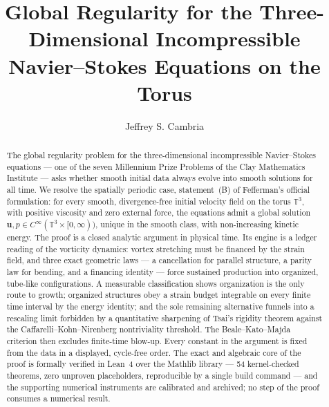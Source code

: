 \documentclass[11pt,letterpaper]{amsart}
\theoremstyle{definition}
\theoremstyle{remark}
\newcommand{\TT}{\mathbb{T}}
\newcommand{\uu}{\boldsymbol{u}}
\begin{document}
\title[Global regularity for Navier--Stokes on the torus]{Global Regularity for the
Three-Dimensional Incompressible Navier--Stokes Equations on the Torus}

\author{Jeffrey S. Cambria}

\vspace*{-3pc}
\begin{abstract}
The global regularity problem for the three-dimensional incompressible Navier--Stokes
equations --- one of the seven Millennium Prize Problems of the Clay Mathematics
Institute --- asks whether smooth initial data always evolve into smooth solutions for
all time. We resolve the spatially periodic case, statement~(B) of Fefferman's official
formulation: for every smooth, divergence-free initial velocity field on the torus
$\TT^3$, with positive viscosity and zero external force, the equations admit a global
solution $\uu, p\in C^\infty(\TT^3\times[0,\infty))$, unique in the smooth class, with
non-increasing kinetic energy. The proof is a closed analytic argument in physical
time. Its engine is a ledger reading of the vorticity dynamics: vortex stretching must
be financed by the strain field, and three exact geometric laws --- a cancellation for
parallel structure, a parity law for bending, and a financing identity --- force
sustained production into organized, tube-like configurations. A measurable
classification shows organization is the only route to growth; organized structures
obey a strain budget integrable on every finite time interval by the energy identity;
and the sole remaining alternative funnels into a rescaling limit forbidden by a
quantitative sharpening of Tsai's rigidity theorem against the
Caffarelli--Kohn--Nirenberg nontriviality threshold. The Beale--Kato--Majda criterion
then excludes finite-time blow-up. Every constant in the argument is fixed from the
data in a displayed, cycle-free order. The exact and algebraic core of the proof is
formally verified in Lean~4 over the Mathlib library --- 54 kernel-checked theorems,
zero unproven placeholders, reproducible by a single build command --- and the
supporting numerical instruments are calibrated and archived; no step of the proof
consumes a numerical result.
\end{abstract}

\maketitle
{\renewcommand{\thefootnote}{\fnsymbol{footnote}}%
}
\end{document}
